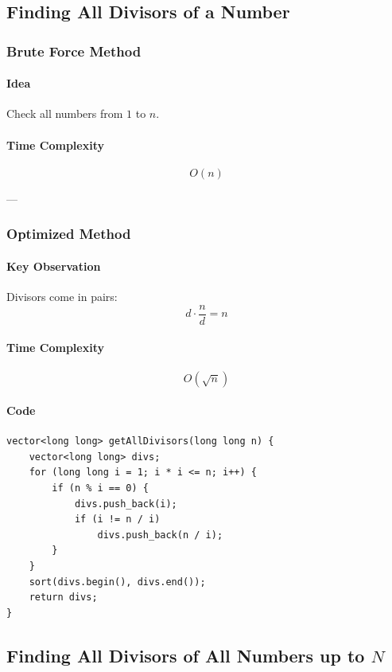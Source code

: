 \documentclass[11pt]{article}
\begin{document}
\subsection{Finding All Divisors of a Number}

\subsubsection{Brute Force Method}

\paragraph{Idea}
Check all numbers from $1$ to $n$.

\paragraph{Time Complexity}
\[
O(n)
\]

---

\subsubsection{Optimized Method}

\paragraph{Key Observation}
Divisors come in pairs:
\[
d \cdot \frac{n}{d} = n
\]

\paragraph{Time Complexity}
\[
O(\sqrt{n})
\]

\paragraph{Code}
\begin{lstlisting}
vector<long long> getAllDivisors(long long n) {
    vector<long long> divs;
    for (long long i = 1; i * i <= n; i++) {
        if (n % i == 0) {
            divs.push_back(i);
            if (i != n / i)
                divs.push_back(n / i);
        }
    }
    sort(divs.begin(), divs.end());
    return divs;
}
\end{lstlisting}

\subsection{Finding All Divisors of All Numbers up to $N$}
\end{document}
